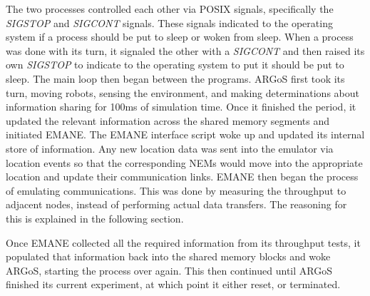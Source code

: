 The two processes controlled each other via POSIX signals, specifically the \textit{SIGSTOP} and \textit{SIGCONT} signals.
These signals indicated to the operating system if a process should be put to sleep or woken from sleep.
When a process was done with its turn, it signaled the other with a \textit{SIGCONT} and then raised its own \textit{SIGSTOP} to indicate to the operating system to put it should be put to sleep.
The main loop then began between the programs.
ARGoS first took its turn, moving robots, sensing the environment, and making determinations about information sharing for 100ms of simulation time.
Once it finished the period, it updated the relevant information across the shared memory segments and initiated EMANE.
The EMANE interface script woke up and updated its internal store of information.
Any new location data was sent into the emulator via location events so that the corresponding NEMs would move into the appropriate location and update their communication links.
EMANE then began the process of emulating communications.
This was done by measuring the throughput to adjacent nodes, instead of performing actual data transfers. The reasoning for this is explained in the following section.\par
Once EMANE collected all the required information from its throughput tests, it populated that information back into the shared memory blocks and woke ARGoS, starting the process over again.
This then continued until ARGoS finished its current experiment, at which point it either reset, or terminated.
